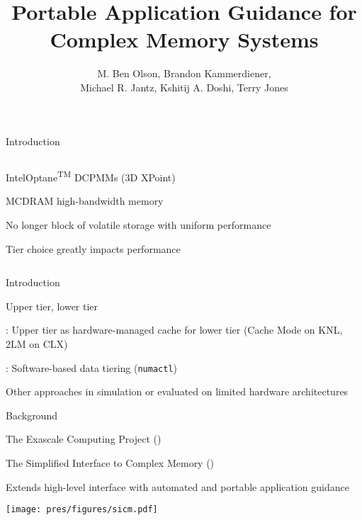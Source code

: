 \documentclass[final,hyperref={pdfpagelabels=false}]{beamer}
\title{Portable Application Guidance for Complex Memory Systems}
\author{M. Ben Olson, Brandon Kammerdiener,\\Michael R. Jantz, Kshitij A. Doshi, Terry Jones}
\begin{document}
\begin{frame}
  \maketitle
\end{frame}

\begin{frame}{Introduction}
\begin{minipage}{\paperwidth}
\begin{columns}[T,onlytextwidth]%
%
  \begin{customlist}{0em}{0em}
    \item Intel\textregistered Optane\textsuperscript{TM} DCPMMs (3D XPoint)
    \item MCDRAM high-bandwidth memory
    \item No longer block of volatile storage with uniform performance
    \item Tier choice greatly impacts performance
  \end{customlist}
%
  \resizebox{.85\textwidth}{!}{%
    
  }
\end{columns}
\end{minipage}
\end{frame}

\begin{frame}{Introduction}
  \begin{customlist}{0em}{0em}
    \item Upper tier, lower tier
    \item {}: Upper
      tier as hardware-managed cache for lower tier (Cache Mode on KNL, 2LM on CLX)
    \item {}:
      Software-based data tiering (\texttt{numactl})
    \item Other approaches in simulation or evaluated on limited hardware architectures
  \end{customlist}
\end{frame}

\begin{frame}{Background}
  \begin{customlist}{0em}{0em}
    \item The Exascale Computing Project ()
    \item The Simplified Interface to Complex Memory ()
    \item Extends high-level interface with automated and portable application
      guidance
  \end{customlist}
  \texttt{[image: pres/figures/sicm.pdf]}
\end{frame}
\end{document}
